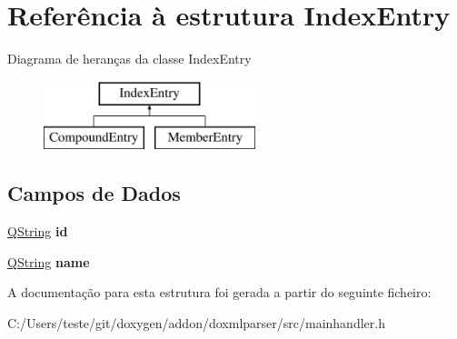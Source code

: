 \hypertarget{struct_index_entry}{\section{Referência à estrutura Index\-Entry}
\label{struct_index_entry}
}
Diagrama de heranças da classe Index\-Entry\begin{figure}[H]
\begin{center}
\leavevmode
\includegraphics[height=2.000000cm]{struct_index_entry}
\end{center}
\end{figure}
\subsection*{Campos de Dados}
\begin{DoxyCompactItemize}
\item 
\hypertarget{struct_index_entry_a9bebc603f023273c485ffbb601a0bfea}{\hyperlink{class_q_string}{Q\-String} {\bfseries id}}\label{struct_index_entry_a9bebc603f023273c485ffbb601a0bfea}

\item 
\hypertarget{struct_index_entry_abc29e461e01cc0c712944f8f47f91331}{\hyperlink{class_q_string}{Q\-String} {\bfseries name}}\label{struct_index_entry_abc29e461e01cc0c712944f8f47f91331}

\end{DoxyCompactItemize}


A documentação para esta estrutura foi gerada a partir do seguinte ficheiro\-:\begin{DoxyCompactItemize}
\item 
C\-:/\-Users/teste/git/doxygen/addon/doxmlparser/src/mainhandler.\-h\end{DoxyCompactItemize}
